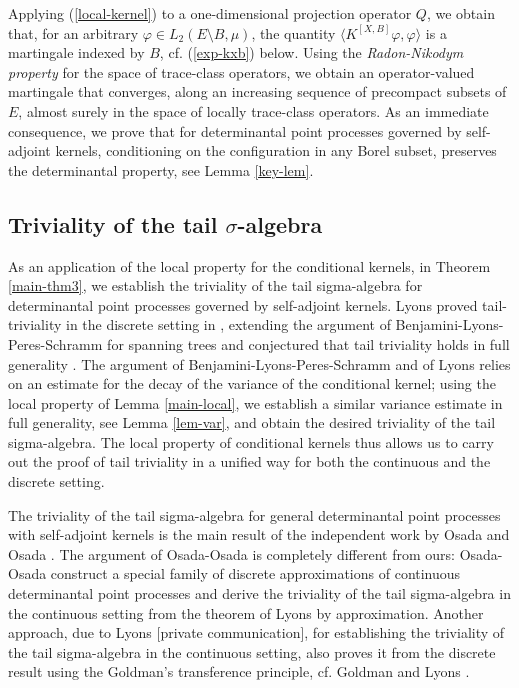 \documentclass[12pt]{paper}
\numberwithin{theorem}{section}
\numberwithin{figure}{section}
\numberwithin{equation}{section}
\begin{document}
 Applying  (\ref{local-kernel}) to a  one-dimensional projection operator $Q$, we obtain that, for an arbitrary $\varphi\in L_2(E\setminus B, \mu)$,  the quantity $\langle K^{[X,B]}\varphi, \varphi\rangle$ is a martingale indexed by $B$, cf. (\ref{exp-kxb})  below.
Using the {\it Radon-Nikodym property} for the space of trace-class operators, we obtain an operator-valued martingale that converges, along an increasing sequence of precompact subsets of $E$, almost surely in the space of locally trace-class operators. As an immediate consequence, we prove that for determinantal point processes governed by self-adjoint kernels, conditioning on the configuration in any Borel subset, preserves the determinantal property, see Lemma  \ref{key-lem}.


\subsection{Triviality of the  tail $\sigma$-algebra}
As an application of the local property for the conditional kernels, in Theorem \ref{main-thm3}, we  establish the triviality of the tail sigma-algebra for determinantal point processes governed by self-adjoint kernels. Lyons proved   tail-triviality in the discrete setting in \cite{DPP-L},
extending the argument of Benjamini-Lyons-Peres-Schramm \cite{BLPS} for spanning trees  and conjectured that tail triviality holds in full generality \cite[Conjecture 3.2]{Lyons-ICM}.
The argument of Benjamini-Lyons-Peres-Schramm \cite{BLPS} and of Lyons \cite{DPP-L} relies on an estimate for the decay of the variance of the conditional kernel;
using the local property of Lemma \ref{main-local}, we establish a similar  variance estimate in full generality, see Lemma  \ref{lem-var}, and obtain the desired triviality of the tail sigma-algebra. The local property of conditional kernels thus allows us  to carry out the proof  of tail triviality in a unified way for both the continuous and the discrete   setting.

 The triviality of the tail sigma-algebra for
general determinantal point processes with self-adjoint kernels is  the main result of the independent  work by Osada and Osada \cite{Osada-Osada}. The argument of Osada-Osada \cite{Osada-Osada} is completely different from ours: Osada-Osada \cite{Osada-Osada}
construct a special family of discrete approximations of  continuous determinantal point processes  and derive the triviality of the tail sigma-algebra in the continuous setting from the theorem of Lyons by approximation.   Another approach, due to Lyons [private  communication], for establishing the triviality of the tail sigma-algebra in the
continuous setting, also proves it from  the  discrete result using the Goldman's transference principle, cf.  Goldman \cite[Proposition 12]{Goldman} and Lyons \cite[Section 3.6]{Lyons-ICM}.
\end{document}
